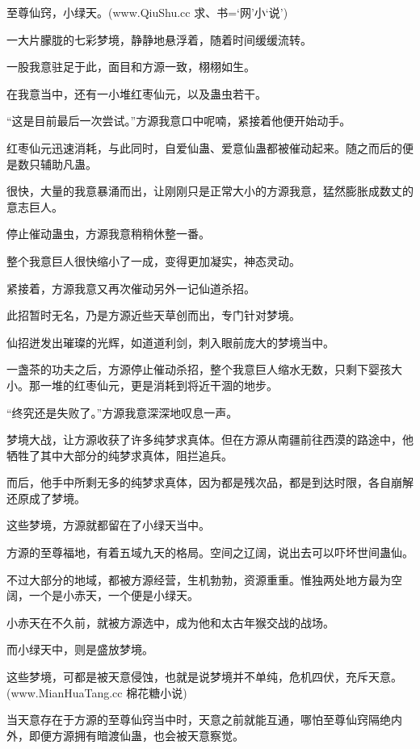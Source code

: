 
\begin{this_body}

至尊仙窍，小绿天。(www.QiuShu.cc 求、书=‘网’小‘说’)

一大片朦胧的七彩梦境，静静地悬浮着，随着时间缓缓流转。

一股我意驻足于此，面目和方源一致，栩栩如生。

在我意当中，还有一小堆红枣仙元，以及蛊虫若干。

“这是目前最后一次尝试。”方源我意口中呢喃，紧接着他便开始动手。

红枣仙元迅速消耗，与此同时，自爱仙蛊、爱意仙蛊都被催动起来。随之而后的便是数只辅助凡蛊。

很快，大量的我意暴涌而出，让刚刚只是正常大小的方源我意，猛然膨胀成数丈的意志巨人。

停止催动蛊虫，方源我意稍稍休整一番。

整个我意巨人很快缩小了一成，变得更加凝实，神态灵动。

紧接着，方源我意又再次催动另外一记仙道杀招。

此招暂时无名，乃是方源近些天草创而出，专门针对梦境。

仙招迸发出璀璨的光辉，如道道利剑，刺入眼前庞大的梦境当中。

一盏茶的功夫之后，方源停止催动杀招，整个我意巨人缩水无数，只剩下婴孩大小。那一堆的红枣仙元，更是消耗到将近干涸的地步。

“终究还是失败了。”方源我意深深地叹息一声。

梦境大战，让方源收获了许多纯梦求真体。但在方源从南疆前往西漠的路途中，他牺牲了其中大部分的纯梦求真体，阻拦追兵。

而后，他手中所剩无多的纯梦求真体，因为都是残次品，都是到达时限，各自崩解还原成了梦境。

这些梦境，方源就都留在了小绿天当中。

方源的至尊福地，有着五域九天的格局。空间之辽阔，说出去可以吓坏世间蛊仙。

不过大部分的地域，都被方源经营，生机勃勃，资源重重。惟独两处地方最为空阔，一个是小赤天，一个便是小绿天。

小赤天在不久前，就被方源选中，成为他和太古年猴交战的战场。

而小绿天中，则是盛放梦境。

这些梦境，可都是被天意侵蚀，也就是说梦境并不单纯，危机四伏，充斥天意。(www.MianHuaTang.cc 棉花糖小说)

当天意存在于方源的至尊仙窍当中时，天意之前就能互通，哪怕至尊仙窍隔绝内外，即便方源拥有暗渡仙蛊，也会被天意察觉。


\end{this_body}
